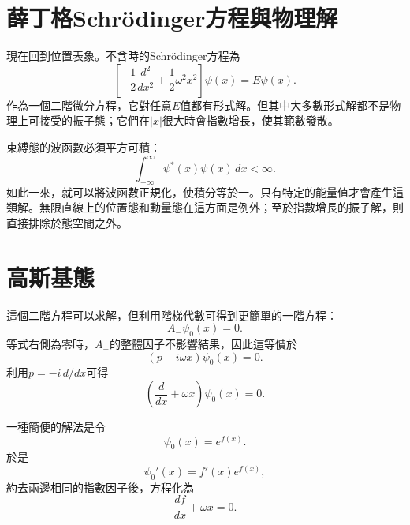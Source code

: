 \section{薛丁格Schr\"odinger方程與物理解}

現在回到位置表象。不含時的Schr\"odinger方程為
\begin{equation}
\left[
-\frac12\frac{d^{2}}{dx^{2}}
+\frac12\omega^{2}x^{2}
\right]\psi(x)=E\psi(x).
\end{equation}
作為一個二階微分方程，它對任意\(E\)值都有形式解。但其中大多數形式解都不是物理上可接受的振子態；它們在\(\lvert x\rvert\)很大時會指數增長，使其範數發散。

束縛態的波函數必須平方可積：
\begin{equation}
\int_{-\infty}^{\infty}\psi^{*}(x)\psi(x)\,dx<\infty.
\end{equation}
如此一來，就可以將波函數正規化，使積分等於一。只有特定的能量值才會產生這類解。無限直線上的位置態和動量態在這方面是例外；至於指數增長的振子解，則直接排除於態空間之外。

\section{高斯基態}

這個二階方程可以求解，但利用階梯代數可得到更簡單的一階方程：
\begin{equation}
A_{-}\psi_{0}(x)=0.
\end{equation}
等式右側為零時，\(A_{-}\)的整體因子不影響結果，因此這等價於
\begin{equation}
(p-i\omega x)\psi_{0}(x)=0.
\end{equation}
利用\(p=-i\,d/dx\)可得
\begin{equation}
\left(\frac{d}{dx}+\omega x\right)\psi_{0}(x)=0.
\end{equation}

\begin{classroomqa}
\end{classroomqa}

一種簡便的解法是令
\begin{equation}
\psi_{0}(x)=e^{f(x)}.
\end{equation}
於是
\[
\psi_{0}'(x)=f'(x)e^{f(x)},
\]
約去兩邊相同的指數因子後，方程化為
\begin{equation}
\frac{df}{dx}+\omega x=0.
\end{equation}

